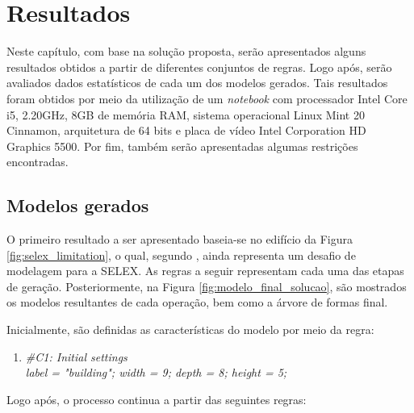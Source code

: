 \chapter{Resultados}
\label{chap:resultados}

Neste capítulo, com base na solução proposta, serão apresentados alguns resultados obtidos a partir de diferentes conjuntos de regras. Logo após, serão avaliados dados estatísticos de cada um dos modelos gerados. Tais resultados foram obtidos por meio da utilização de um \textit{notebook} com processador Intel Core i5, 2.20GHz, 8GB de memória RAM, sistema operacional Linux Mint 20 Cinnamon, arquitetura de 64 bits e placa de vídeo Intel Corporation HD Graphics 5500. Por fim, também serão apresentadas algumas restrições encontradas.

\section{Modelos gerados}
\label{sec:resultados_modelos}

O primeiro resultado a ser apresentado baseia-se no edifício da Figura \ref{fig:selex_limitation}, o qual, segundo , ainda representa um desafio de modelagem para a \gls{SELEX}. As regras a seguir representam cada uma das etapas de geração. Posteriormente, na Figura \ref{fig:modelo_final_solucao}, são mostrados os modelos resultantes de cada operação, bem como a árvore de formas final.

Inicialmente, são definidas as características do modelo por meio da regra:

\vspace{0.3cm}

\begin{enumerate}
    \item[] \textit{\#C1: Initial settings} \\
            \qquad \textit{label = "building"; width = 9; depth = 8; height = 5;} 
\end{enumerate}

\vspace{0.3cm}

Logo após, o processo continua a partir das seguintes regras:

\vspace{0.3cm}

